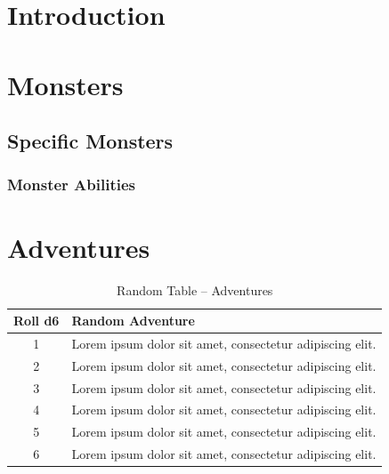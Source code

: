 
\section{Introduction}
\kant[2]

%

\section{Monsters}
\kant[5]

\subsection*{Specific Monsters}

\subsubsection*{Monster Abilities}


\section{Adventures}
\kant[9]
\begin{table}[ht]
	\fontsize{7pt}{7pt}\selectfont
	\centering
	\begin{tabular}{|c|p{4.5cm}|}
		\hline
		\textbf{Roll d6} & \textbf{Random Adventure}                                \\
		\hline
		\hline
		1                & Lorem ipsum dolor sit amet, consectetur adipiscing elit. \\
		2                & Lorem ipsum dolor sit amet, consectetur adipiscing elit. \\
		3                & Lorem ipsum dolor sit amet, consectetur adipiscing elit. \\
		4                & Lorem ipsum dolor sit amet, consectetur adipiscing elit. \\
		5                & Lorem ipsum dolor sit amet, consectetur adipiscing elit. \\
		6                & Lorem ipsum dolor sit amet, consectetur adipiscing elit. \\
		\hline
	\end{tabular}
	\caption{Random Table -- Adventures}
\end{table}

